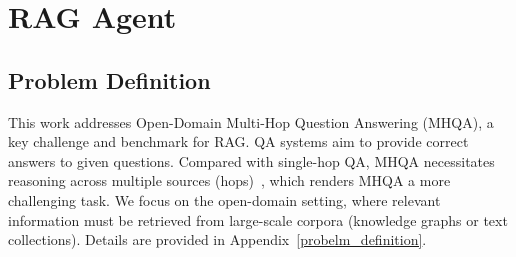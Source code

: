 \section{RAG Agent}


\subsection{Problem Definition}

This work addresses Open-Domain Multi-Hop Question Answering (MHQA), a key challenge and benchmark for RAG.
QA systems aim to provide correct answers to given questions.
Compared with single-hop QA, MHQA necessitates reasoning across multiple sources (hops)~\cite{mavi2024multi}, which renders MHQA a more challenging task. %
We focus on the open-domain setting, where relevant information must be retrieved from large-scale corpora (knowledge graphs or text collections).
Details are provided in Appendix~\ref{probelm_definition}.

